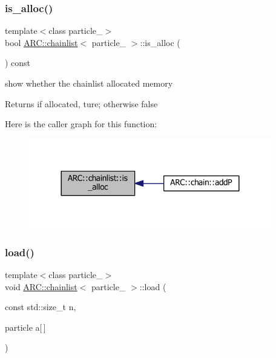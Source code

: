 \subsubsection{\texorpdfstring{is\+\_\+alloc()}{is\_alloc()}}
{\footnotesize\ttfamily template$<$class particle\+\_\+$>$ \\
bool \hyperlink{classARC_1_1chainlist}{A\+R\+C\+::chainlist}$<$ particle\+\_\+ $>$\+::is\+\_\+alloc (\begin{DoxyParamCaption}{ }\end{DoxyParamCaption}) const\hspace{0.3cm}{\ttfamily [inline]}}



show whether the chainlist allocated memory 

\begin{DoxyReturn}{Returns}
if allocated, ture; otherwise false 
\end{DoxyReturn}
Here is the caller graph for this function\+:
\nopagebreak
\begin{figure}[H]
\begin{center}
\leavevmode
\includegraphics[width=300pt]{classARC_1_1chainlist_a0e2f35b8eabe9d9ecd77ed9f24e083de_icgraph}
\end{center}
\end{figure}
\hypertarget{classARC_1_1chainlist_aa767ec18c7ed7372a1ef1a4b27a171c3}{}\label{classARC_1_1chainlist_aa767ec18c7ed7372a1ef1a4b27a171c3} 
\subsubsection{\texorpdfstring{load()}{load()}}
{\footnotesize\ttfamily template$<$class particle\+\_\+$>$ \\
void \hyperlink{classARC_1_1chainlist}{A\+R\+C\+::chainlist}$<$ particle\+\_\+ $>$\+::load (\begin{DoxyParamCaption}\item[{const std\+::size\+\_\+t}]{n,  }\item[{particle}]{a\mbox{[}$\,$\mbox{]} }\end{DoxyParamCaption})\hspace{0.3cm}{\ttfamily [inline]}}



